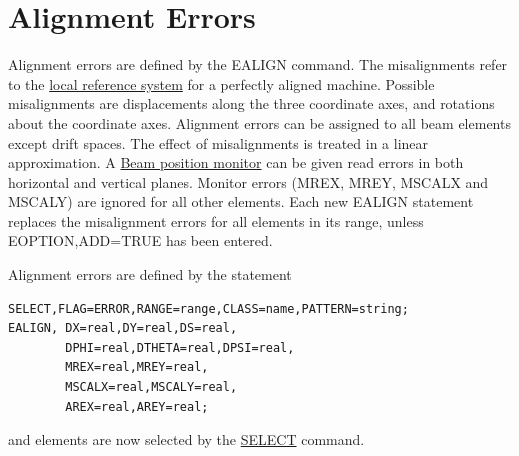 
\section{Alignment Errors} %
Alignment errors are defined by the EALIGN command. The misalignments
refer to the \href{../Introduction/local_system.html}{local reference
  system} for a perfectly aligned machine. Possible misalignments are
displacements along the three coordinate axes, and rotations about the
coordinate axes. Alignment errors can be assigned to all beam elements
except drift spaces. The effect of misalignments is treated in a linear
approximation. A \href{read HREF=../Introduction/monitors.html}{Beam
  position monitor} can be given read errors in both horizontal and
vertical planes. Monitor errors (MREX, MREY, MSCALX and MSCALY) are
ignored for all other elements. Each new EALIGN statement replaces the
misalignment errors for all elements in its range, unless
EOPTION,ADD=TRUE has been entered.  

Alignment errors are defined by the statement 

\begin{verbatim}
SELECT,FLAG=ERROR,RANGE=range,CLASS=name,PATTERN=string;
EALIGN, DX=real,DY=real,DS=real, 
        DPHI=real,DTHETA=real,DPSI=real, 
        MREX=real,MREY=real,
        MSCALX=real,MSCALY=real,
        AREX=real,AREY=real;
\end{verbatim}
and elements are now selected by the
\href{../Introduction/select.html}{SELECT} command. 

